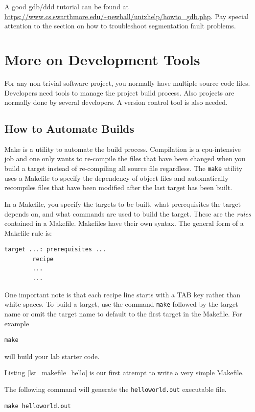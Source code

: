 A good gdb/ddd tutorial can be found at \url{https://www.cs.swarthmore.edu/~newhall/unixhelp/howto_gdb.php}. Pay special attention to the section on how to troubleshoot segmentation fault problems.
\section{More on Development Tools}

For any non-trivial software project, you normally have multiple source code files. Developers need tools to manage the project build process. Also projects are normally done by several developers. A version control tool is also needed.

\subsection{How to Automate Builds}

Make is a utility to automate the build process. Compilation is a cpu-intensive job and one only wants to re-compile the files that have been changed when you build a target instead of re-compiling all source file regardless. 
The \verb+make+ utility uses a Makefile to specify the dependency of object files and automatically recompiles files that have been modified after the last target has been built. 

In a Makefile, you specify the targets to be built, what prerequisites the target depends on, and what commands are used to build the target. These are the {\em rules} contained in a Makefile. Makefiles have their own syntax.
The general form of a Makefile rule is:
\begin{lstlisting}[style=makefile]
target ...: prerequisites ... 
        recipe
        ...	
        ...	
\end{lstlisting}
One important note is that each recipe line starts with a TAB key rather than white spaces. To build a target, use the command \verb+make+ followed by the target name or omit the target name to default to the first target in the Makefile. For example
\begin{lstlisting}[style=bash]
make
\end{lstlisting}
will build your lab starter code.

Listing \ref{lst_makefile_hello} is our first attempt to write a very simple Makefile.


The following command will generate the \verb+helloworld.out+ executable file.
\begin{lstlisting}[style=bash]
make helloworld.out
\end{lstlisting}

